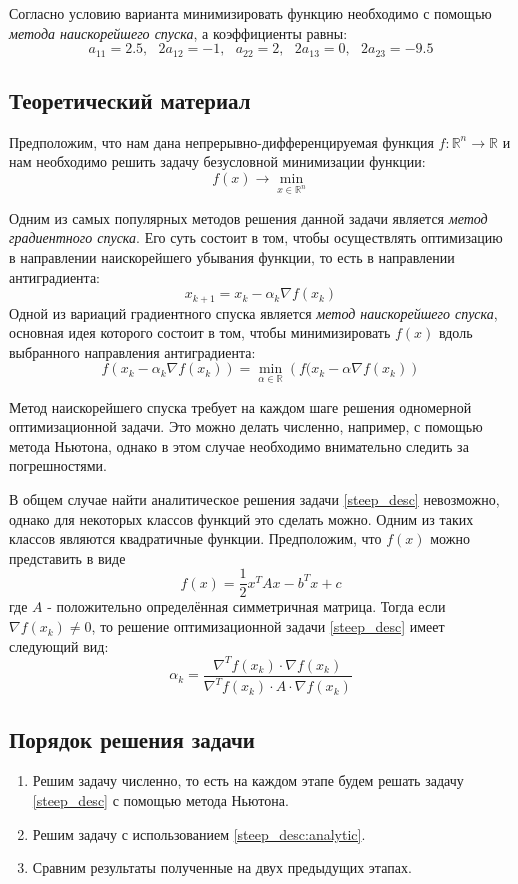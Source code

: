 \documentclass[12pt]{article}%
\begin{document}
Согласно условию варианта минимизировать функцию необходимо с помощью \textit{метода наискорейшего спуска}, а коэффициенты равны:
\[
a_{11} = 2.5,\ \ \ 2a_{12}=-1,\ \ \ a_{22}=2,\ \ \ 2a_{13} = 0,\ \ \ 2a_{23} = -9.5 
\]

\subsection{Теоретический материал}
Предположим, что нам дана непрерывно-дифференцируемая функция $f: \mathbb{R}^n \rightarrow \mathbb{R}$ и нам необходимо решить задачу безусловной минимизации функции:
\[
f(x) \rightarrow \min\limits_{x \in \mathbb{R}^n}
\]

Одним из самых популярных методов решения данной задачи является \textit{метод градиентного спуска}. Его суть состоит в том, чтобы осуществлять оптимизацию в направлении наискорейшего убывания функции, то есть в направлении антиградиента:
\[
x_{k+1} = x_{k} - \alpha_{k} \nabla f(x_{k})
\]
Одной из вариаций градиентного спуска является \textit{метод наискорейшего спуска}, основная идея которого состоит в том, чтобы минимизировать $f(x)$ вдоль выбранного направления антиградиента:
\begin{equation}\label{steep_desc}
    f(x_k - \alpha_k \nabla f(x_{k})) =
    \min\limits_{\alpha \in \mathbb{R}}\left(
        f(x_k - \alpha \nabla f(x_k)
    \right)
\end{equation}

Метод наискорейшего спуска требует на каждом шаге решения одномерной оптимизационной задачи. Это можно делать численно, например, с помощью метода Ньютона, однако в этом случае необходимо внимательно следить за погрешностями.

В общем случае найти аналитическое решения задачи \ref{steep_desc} невозможно, однако для некоторых классов функций это сделать можно. Одним из таких классов являются квадратичные функции. Предположим, что $f(x)$ можно представить в виде
\[
f(x) = \frac{1}{2} x^T A x - b^T x + c
\]
где $A$ - положительно определённая симметричная матрица. Тогда если $\nabla f(x_k) \ne 0$, то решение оптимизационной задачи \ref{steep_desc} имеет следующий вид:
\begin{equation}\label{steep_desc:analytic}
    \alpha_k = \frac{\nabla^T f(x_k)\cdot \nabla f(x_k)}{
    \nabla^T f(x_k) \cdot A \cdot \nabla f(x_k)
    }
\end{equation}

\subsection{Порядок решения задачи}
\begin{enumerate}
    \item Решим задачу численно, то есть на каждом этапе будем решать задачу \ref{steep_desc} с помощью метода Ньютона.
    \item Решим задачу с использованием \ref{steep_desc:analytic}.
    \item Сравним результаты полученные на двух предыдущих этапах.
\end{enumerate}
\end{document}
